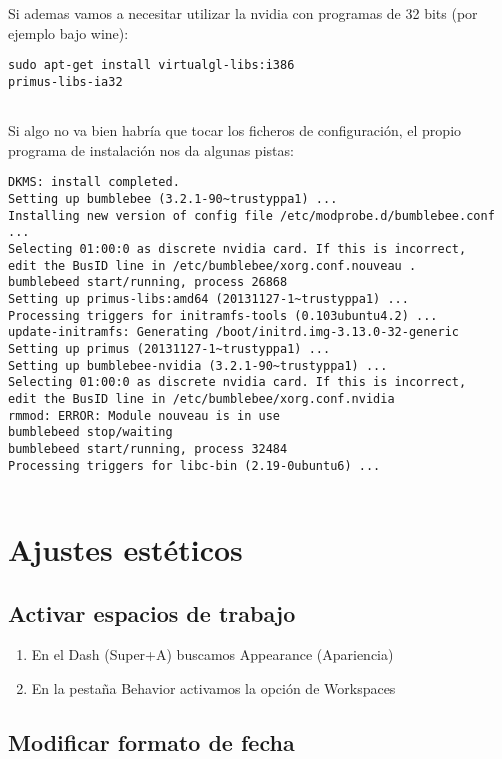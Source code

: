 Si ademas vamos a necesitar utilizar la nvidia con programas de 32 bits
(por ejemplo bajo wine):

\begin{verbatim}
sudo apt-get install virtualgl-libs:i386
primus-libs-ia32
      
\end{verbatim}

Si algo no va bien habría que tocar los ficheros de configuración, el
propio programa de instalación nos da algunas pistas:

\begin{verbatim}
DKMS: install completed.
Setting up bumblebee (3.2.1-90~trustyppa1) ...
Installing new version of config file /etc/modprobe.d/bumblebee.conf ...
Selecting 01:00:0 as discrete nvidia card. If this is incorrect,
edit the BusID line in /etc/bumblebee/xorg.conf.nouveau .
bumblebeed start/running, process 26868
Setting up primus-libs:amd64 (20131127-1~trustyppa1) ...
Processing triggers for initramfs-tools (0.103ubuntu4.2) ...
update-initramfs: Generating /boot/initrd.img-3.13.0-32-generic
Setting up primus (20131127-1~trustyppa1) ...
Setting up bumblebee-nvidia (3.2.1-90~trustyppa1) ...
Selecting 01:00:0 as discrete nvidia card. If this is incorrect,
edit the BusID line in /etc/bumblebee/xorg.conf.nvidia
rmmod: ERROR: Module nouveau is in use
bumblebeed stop/waiting
bumblebeed start/running, process 32484
Processing triggers for libc-bin (2.19-0ubuntu6) ...
      
\end{verbatim}

\section{Ajustes estéticos}\label{ajustes-estuxe9ticos}

\subsection{Activar espacios de
trabajo}\label{activar-espacios-de-trabajo}

\begin{enumerate}
\def\labelenumi{\arabic{enumi}.}
\item
  En el Dash ({Super+A}) buscamos Appearance (Apariencia)
\item
  En la pestaña Behavior activamos la opción de Workspaces
\end{enumerate}

\subsection{Modificar formato de
fecha}\label{modificar-formato-de-fecha}

